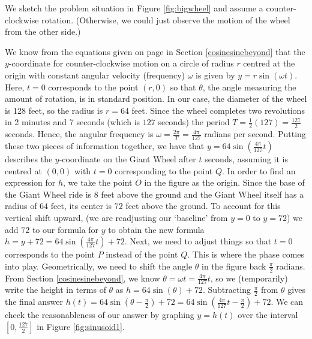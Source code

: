 {We sketch the problem situation in Figure \ref{fig:bigwheel} and assume a counter-clockwise rotation. (Otherwise, we could just observe the motion of the wheel from the other side.)


We know from the equations given on page \pageref{equationsforcircularmotion} in Section \ref{cosinesinebeyond} that the $y$-coordinate for counter-clockwise motion on a circle of radius $r$ centred at the origin with constant angular velocity (frequency) $\omega$ is given by $y = r\sin(\omega t)$.  Here,  $t=0$ corresponds to the point $(r,0)$ so that $\theta$, the angle measuring the amount of rotation, is in standard position. In our case, the diameter of the wheel is 128 feet, so the radius is $r = 64$ feet. Since the wheel completes two revolutions in 2 minutes and 7 seconds (which is $127$ seconds) the period $T = \frac{1}{2} (127) = \frac{127}{2}$ seconds.  Hence, the angular frequency is $\omega = \frac{2\pi}{T} = \frac{4 \pi}{127}$ radians per second.  Putting these two pieces of information together, we have that  $y = 64 \sin\left(\frac{4 \pi}{127} t\right)$ describes the $y$-coordinate on the Giant Wheel after $t$ seconds, assuming it is centred at $(0,0)$ with $t=0$ corresponding to the point $Q$.  In order to find an expression for $h$, we take the point $O$ in the figure as the origin.    Since the base of the Giant Wheel ride is $8$ feet above the ground and the Giant Wheel itself has a radius of  $64$ feet, its center is $72$ feet above the ground. To account for this vertical shift upward, (we are readjusting our `baseline' from $y=0$ to $y=72$) we add $72$ to our formula for $y$ to obtain the new formula $h = y  + 72 = 64 \sin\left(\frac{4 \pi}{127} t\right) + 72$.  Next, we need to adjust things so that $t=0$ corresponds to the point $P$ instead of the point $Q$. This is where the phase comes into play.  Geometrically, we need to shift the angle $\theta$ in the figure back $\frac{\pi}{2}$ radians.  From Section \ref{cosinesinebeyond}, we know $\theta = \omega t = \frac{4 \pi}{127} t$, so we (temporarily) write the height in terms of $\theta$ as  $h =64 \sin\left(\theta\right) + 72$.    Subtracting $\frac{\pi}{2}$ from $\theta$ gives the final answer $h(t) = 64 \sin\left(\theta - \frac{\pi}{2}\right) + 72 = 64\sin\left(\frac{4 \pi}{127} t -\frac{\pi}{2} \right) + 72$. We can check the reasonableness of our answer by graphing $y = h(t)$ over the interval $\left[0, \frac{127}{2}\right]$ in Figure \ref{fig:sinusoid1}.

}
